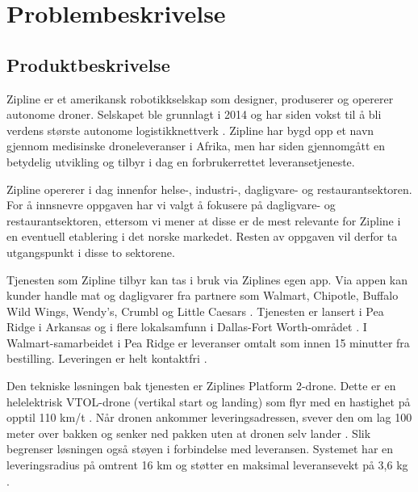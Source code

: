 \section{Problembeskrivelse}

\subsection{Produktbeskrivelse}

Zipline er et amerikansk robotikkselskap som designer, produserer og opererer
autonome droner. Selskapet ble grunnlagt i 2014 og har siden vokst til å bli
verdens største autonome logistikknettverk \parencite{konapur2025}. Zipline
har bygd opp et navn gjennom medisinske droneleveranser i Afrika, men har
siden gjennomgått en betydelig utvikling og tilbyr i dag en forbrukerrettet
leveransetjeneste.

Zipline opererer i dag innenfor helse-, industri-, dagligvare- og
restaurantsektoren. For å innsnevre oppgaven har vi valgt
å fokusere på dagligvare- og restaurantsektoren, ettersom vi mener at
disse er de mest relevante for Zipline i en eventuell etablering i det
norske markedet. Resten av oppgaven vil derfor ta utgangspunkt i disse to
sektorene.

Tjenesten som Zipline tilbyr kan tas i bruk via Ziplines egen app. Via
appen kan kunder handle mat og dagligvarer fra partnere som Walmart,
Chipotle, Buffalo Wild Wings, Wendy's, Crumbl og Little Caesars
\parencite{ziplineabout}. Tjenesten er lansert i Pea Ridge i Arkansas og i
flere lokalsamfunn i Dallas-Fort Worth-området
\parencite{ziplinefactsheet}. I Walmart-samarbeidet i Pea Ridge er
leveranser omtalt som innen 15 minutter fra bestilling. Leveringen er helt
kontaktfri \parencite{time2022_zipline, korosec2026}.

Den tekniske løsningen bak tjenesten er Ziplines Platform 2-drone. Dette er en
helelektrisk VTOL-drone (vertikal start og landing) som flyr med en hastighet
på opptil 110 km/t \parencite{ziplinefactsheet}. Når dronen ankommer
leveringsadressen, svever den om lag 100 meter over bakken og senker ned
pakken uten at dronen selv lander \parencite{ziplinefactsheet}. Slik begrenser
løsningen også støyen i forbindelse med leveransen. Systemet har en
leveringsradius på omtrent 16 km og støtter en maksimal leveransevekt på 3,6
kg
\parencite{ziplinefactsheet}.

